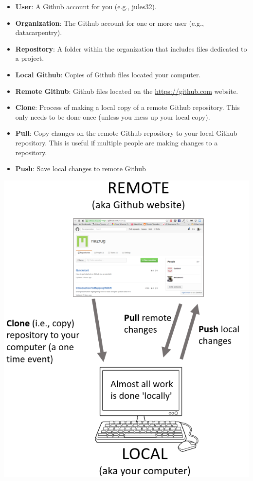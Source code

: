 \documentclass[]{book}
\providecommand{\tightlist}{%
  \setlength{\itemsep}{0pt}\setlength{\parskip}{0pt}}
\begin{document}
\begin{itemize}
\tightlist
\item
  \textbf{User}: A Github account for you (e.g., jules32).
\item
  \textbf{Organization}: The Github account for one or more user (e.g., datacarpentry).
\item
  \textbf{Repository}: A folder within the organization that includes files dedicated to a project.
\item
  \textbf{Local Github}: Copies of Github files located your computer.
\item
  \textbf{Remote Github}: Github files located on the \url{https://github.com} website.
\item
  \textbf{Clone}: Process of making a local copy of a remote Github repository. This only needs to be done once (unless you mess up your local copy).
\item
  \textbf{Pull}: Copy changes on the remote Github repository to your local Github repository. This is useful if multiple people are making changes to a repository.
\item
  \textbf{Push}: Save local changes to remote Github
\end{itemize}

\includegraphics{img/push_pull_clone.png}
\end{document}
